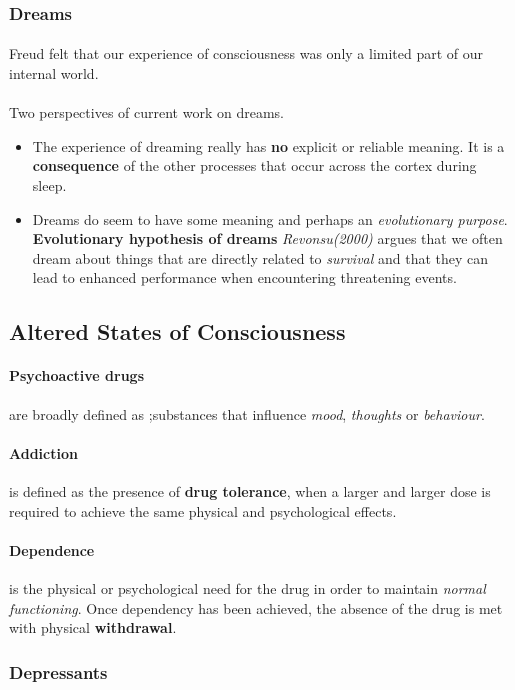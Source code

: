 \documentclass{article}
\begin{document}
	\subsubsection{Dreams}
	\paragraph{} Freud felt that our experience of consciousness was only a limited part of our internal world.
	\paragraph{} Two perspectives of current work on dreams.
	\begin{itemize}
		\item The experience of dreaming really has \textbf{no} explicit or reliable meaning. It is a \textbf{consequence} of the other processes that occur across the cortex during sleep.
		\item Dreams do seem to have some meaning and perhaps an \emph{evolutionary purpose}. \textbf{Evolutionary hypothesis of dreams} \emph{Revonsu(2000)} argues that we often dream about things that are directly related to \emph{survival} and that they can lead to enhanced performance when encountering threatening events.
	\end{itemize}
	\subsection{Altered States of Consciousness}
	\paragraph{Psychoactive drugs} are broadly defined as ;substances that influence \emph{mood}, \emph{thoughts} or \emph{behaviour}.
	\paragraph{Addiction} is defined as the presence of \textbf{drug tolerance}, when a larger and larger dose is required to achieve the same physical and psychological effects.
	\paragraph{Dependence} is the physical or psychological need for the drug in order to maintain \emph{normal functioning}. Once dependency has been achieved, the absence of the drug is met with physical \textbf{withdrawal}.
	\subsubsection{Depressants}
\end{document}
